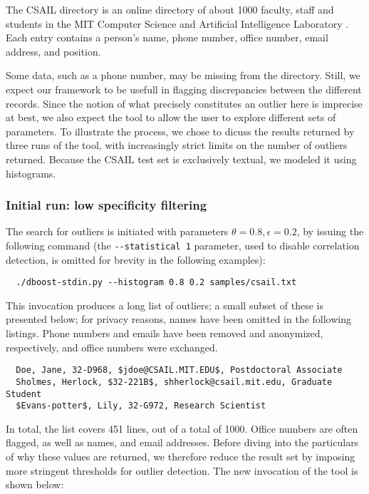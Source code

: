 The CSAIL directory is an online directory of about 1000 faculty, staff and students in the MIT Computer Science and Artificial Intelligence Laboratory \cite{CSAILDirectory}. Each entry contains a person's name, phone number, office number, email address, and position.

Some data, such as a phone number, may be missing from the directory. Still, we expect our framework to be usefull in flagging discrepancies between the different records. Since the notion of what precisely constitutes an outlier here is imprecise at best, we also expect the tool to allow the user to explore different sets of parameters. To illustrate the process, we chose to dicuss the results returned by three runs of the tool, with increasingly strict limits on the number of outliers returned. Because the CSAIL test set is exclusively textual, we modeled it using histograms.

\subsubsection{Initial run: low specificity filtering}
The search for outliers is initiated with parameters $\theta = 0.8, \epsilon = 0.2$, by issuing the following command (the \lstinline{--statistical 1} parameter, used to disable correlation detection, is omitted for brevity in the following examples):

\begin{lstlisting}
  ./dboost-stdin.py --histogram 0.8 0.2 samples/csail.txt
\end{lstlisting}

This invocation produces a long list of outliers; a small subset of these is presented below; for privacy reasons, names have been omitted in the following listings. Phone numbers and emails have been removed and anonymized, respectively, and office numbers were exchanged.

\begin{lstlisting}
  Doe, Jane, 32-D968, $jdoe@CSAIL.MIT.EDU$, Postdoctoral Associate
  Sholmes, Herlock, $32-221B$, shherlock@csail.mit.edu, Graduate Student
  $Evans-potter$, Lily, 32-G972, Research Scientist
\end{lstlisting}

In total, the list covers 451 lines, out of a total of 1000. Office numbers are often flagged, as well as names, and email addresses. Before diving into the particulars of why these values are returned, we therefore reduce the result set by imposing more stringent thresholds for outlier detection. The new invocation of the tool is shown below: 


